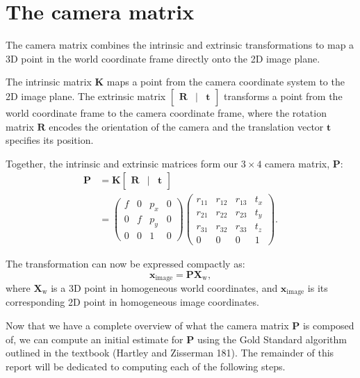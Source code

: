 \documentclass[12pt]{article}
\begin{document}
\section{The camera matrix}

The camera matrix combines the intrinsic and extrinsic transformations to map a 3D point in the world coordinate frame directly onto the 2D image plane.

The intrinsic matrix $\mathbf{K}$ maps a point from the camera coordinate system to the 2D image plane. The extrinsic matrix $\begin{bmatrix} \mathbf{R} & | & \mathbf{t} \end{bmatrix}$ transforms a point from the world coordinate frame to the camera coordinate frame, where the rotation matrix $\mathbf{R}$ encodes the orientation of the camera and the translation vector $\mathbf{t}$ specifies its position.

Together, the intrinsic and extrinsic matrices form our $3\times 4$ camera matrix, $\mathbf{P}$:
\begin{align*}
    \mathbf{P} &= \mathbf{K} \begin{bmatrix} \mathbf{R} & | & \mathbf{t} \end{bmatrix} \\
    &= \begin{pmatrix}
        f & 0 & p_x & 0 \\
        0 & f & p_y & 0 \\
        0 & 0 & 1 & 0
    \end{pmatrix}
    \begin{pmatrix}
        r_{11} & r_{12} & r_{13} & t_x \\
        r_{21} & r_{22} & r_{23} & t_y \\
        r_{31} & r_{32} & r_{33} & t_z \\
        0 & 0 & 0 & 1
    \end{pmatrix}.
\end{align*}

The transformation can now be expressed compactly as:
$$
\mathbf{x}_{\text{image}} = \mathbf{P} \mathbf{X}_{\text{w}},
$$
where $\mathbf{X}_{\text{w}}$ is a 3D point in homogeneous world coordinates, and $\mathbf{x}_{\text{image}}$ is its corresponding 2D point in homogeneous image coordinates.

Now that we have a complete overview of what the camera matrix $ \mathbf{P} $ is composed of, we can compute an initial estimate for $ \mathbf{P} $ using the Gold Standard algorithm outlined in the textbook (Hartley and Zisserman 181). The remainder of this report will be dedicated to computing each of the following steps.
\end{document}
